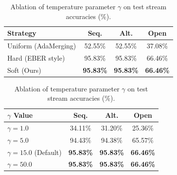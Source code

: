 \documentclass{article}
\theoremstyle{plain}
\theoremstyle{definition}
\theoremstyle{remark}
\begin{document}
\begin{table}[t]
\begin{minipage}{0.48\textwidth}
\centering
\caption{Ablation of Batch Normalization buffer fusion strategies on test stream accuracies (\%).}
\label{tab:ablation_bn}
\vskip 0.04in
\begin{footnotesize}
\begin{sc}
\renewcommand{\arraystretch}{0.88}
\begin{tabular}{lccc}
\toprule
Strategy & Seq. & Alt. & Open \\
\midrule
Uniform (AdaMerging) & 52.55\% & 52.55\% & 37.08\% \\
Hard (EBER style) & 95.83\% & 95.83\% & 66.46\% \\
Soft (Ours) & \textbf{95.83\%} & \textbf{95.83\%} & \textbf{66.46\%} \\
\bottomrule
\end{tabular}
\end{sc}
\end{footnotesize}
\end{minipage}
\hfill
\begin{minipage}{0.48\textwidth}
\centering
\caption{Ablation of temperature parameter $\gamma$ on test stream accuracies (\%).}
\label{tab:ablation_temp}
\vskip 0.04in
\begin{footnotesize}
\begin{sc}
\renewcommand{\arraystretch}{0.88}
\begin{tabular}{lccc}
\toprule
$\gamma$ Value & Seq. & Alt. & Open \\
\midrule
$\gamma = 1.0$ & 34.11\% & 31.20\% & 25.36\% \\
$\gamma = 5.0$ & 94.43\% & 94.38\% & 65.57\% \\
$\gamma = 15.0$ (Default) & \textbf{95.83\%} & \textbf{95.83\%} & \textbf{66.46\%} \\
$\gamma = 50.0$ & \textbf{95.83\%} & \textbf{95.83\%} & \textbf{66.46\%} \\
\bottomrule
\end{tabular}
\end{sc}
\end{footnotesize}
\end{minipage}

\vspace{0.04in}


\end{table}
\end{document}
